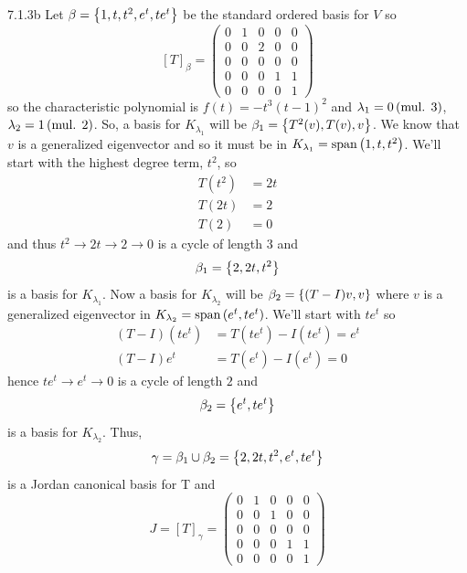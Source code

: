 \documentclass{exam}
\begin{document}
  \begin{problem}{7.1.3b}
    Let $\beta = \left\{1, t, t^2, e^t, te^t \right\}$ be the standard ordered basis for $V$ so 
    \[
      [T]_\beta = \begin{pmatrix}
        0 & 1 & 0 & 0 & 0 \\
        0 & 0 & 2 & 0 & 0 \\
        0 & 0 & 0 & 0 & 0 \\
        0 & 0 & 0 & 1 & 1 \\
        0 & 0 & 0 & 0 & 1
      \end{pmatrix}
    \]
    so the characteristic polynomial is $f(t) = -t^3(t - 1)^2$ and $\lambda_1 = 0 \,(\text{mul. } 3)$, $\lambda_2 = 1 \,(\text{mul. } 2)$. So, a basis for $K_{\lambda_{1}}$ will be $\beta_{1} = \left\{T^{2}(v), T(v), v \right\}$. We know that $v$ is a generalized eigenvector and so it must be in $K_{\lambda_{1}} = \text{span}\left({1, t, t^2}\right)$. We'll start with the highest degree term, $t^2$, so 
    \begin{align*}
      T(t^2) &= 2t \\
      T(2t) &= 2 \\
      T(2) &= 0 
    \end{align*}
    and thus $t^2 \to 2t \to 2 \to 0$ is a cycle of length $3$ and 
    \[
      \beta_1 = \left\{2, 2t, t^2 \right\}
    \]
    is a basis for $K_{\lambda_{1}}$. Now a basis for $K_{\lambda_{2}}$ will be $\beta_2 = \left\{(T - I)v, v \right\}$ where $v$ is a generalized eigenvector in $K_{\lambda_{2}} = \text{span}\left({e^t, te^t}\right)$. We'll start with $te^{t}$ so 
    \begin{align*}
      (T - I)(te^{t}) &= T(te^{t}) - I(te^{t}) = e^{t} \\
      (T - I)e^t &= T(e^t) - I(e^t) = 0
    \end{align*}
    hence $te^{t} \to e^{t} \to 0$ is a cycle of length $2$ and 
    \[
      \beta_2 = \left\{e^t, te^{t} \right\}
    \]
    is a basis for $K_{\lambda_2}$. Thus, 
    \[
      \gamma = \beta_{1} \cup \beta_2 = \left\{2, 2t, t^2, e^t, te^t \right\}
    \]
    is a Jordan canonical basis for T and 
    \[
      J = [T]_\gamma = \begin{pmatrix}
        0 & 1 & 0 & 0 & 0 \\
        0 & 0 & 1 & 0 & 0 \\
        0 & 0 & 0 & 0 & 0 \\
        0 & 0 & 0 & 1 & 1 \\
        0 & 0 & 0 & 0 & 1
      \end{pmatrix}
    \]


\end{problem}
\end{document}
